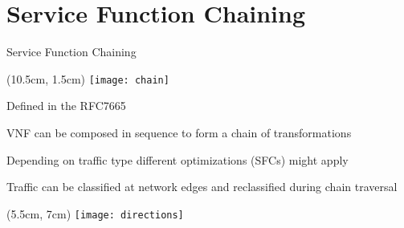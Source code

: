 \section{Service Function Chaining}
\begin{frame}{Service Function Chaining}

  \begin{textblock*}{1cm}(10.5cm, 1.5cm)
    \texttt{[image: chain]}
  \end{textblock*}

  Defined in the RFC7665

  \vspace{0.46cm}

  VNF can be composed in sequence to form a chain of transformations

  \vspace{0.46cm}

  Depending on traffic type different optimizations (SFCs) might apply

  \vspace{0.46cm}

  Traffic can be classified at network edges and reclassified during chain
  traversal

  \begin{textblock*}{1cm}(5.5cm, 7cm)
    \texttt{[image: directions]}
  \end{textblock*}

\end{frame}